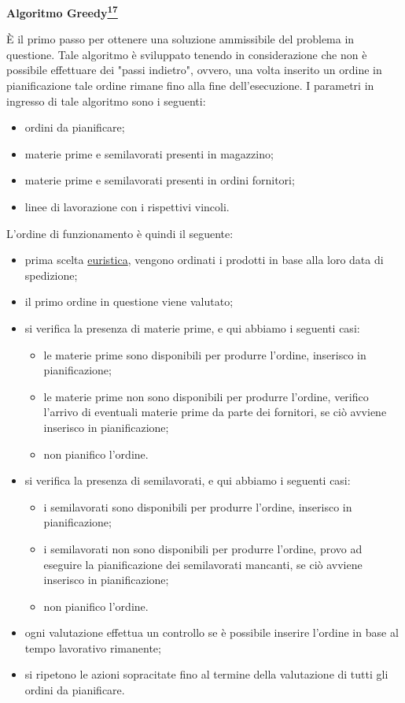 \textbf{Algoritmo Greedy\hyperref[greedy]{\textsuperscript{17}}}

È il primo passo per ottenere una soluzione ammissibile del problema in questione. Tale algoritmo è sviluppato tenendo in considerazione che non è possibile effettuare dei "passi indietro",
ovvero, una volta inserito un ordine in pianificazione tale ordine rimane fino alla fine dell'esecuzione. I parametri in ingresso di tale algoritmo sono i seguenti:
\begin{itemize}
    \item ordini da pianificare;
    \item materie prime e semilavorati presenti in magazzino;
    \item materie prime e semilavorati presenti in ordini fornitori;
    \item linee di lavorazione con i rispettivi vincoli.
\end{itemize}

L'ordine di funzionamento è quindi il seguente:

\begin{itemize}
    \item prima scelta \hyperref[Euristica]{euristica\glo}, vengono ordinati i prodotti in base alla loro data di spedizione;
    \item il primo ordine in questione viene valutato;
    \item si verifica la presenza di materie prime, e qui abbiamo i seguenti casi:
            \begin{itemize}
                \item le materie prime sono disponibili per produrre l'ordine, inserisco in pianificazione;
                \item le materie prime non sono disponibili per produrre l'ordine, verifico l'arrivo di eventuali materie prime da parte dei fornitori,
                 se ciò avviene inserisco in pianificazione;
                \item non pianifico l'ordine.
            \end{itemize}
    \item si verifica la presenza di semilavorati, e qui abbiamo i seguenti casi:
            \begin{itemize}
                \item i semilavorati sono disponibili per produrre l'ordine, inserisco in pianificazione;
                \item i semilavorati non sono disponibili per produrre l'ordine, provo ad eseguire la pianificazione dei semilavorati mancanti, se ciò avviene
                inserisco in pianificazione;
                \item non pianifico l'ordine.
            \end{itemize}
    \item ogni valutazione effettua un controllo se è possibile inserire l'ordine in base al tempo lavorativo rimanente;
    \item si ripetono le azioni sopracitate fino al termine della valutazione di tutti gli ordini da pianificare.
\end{itemize}

